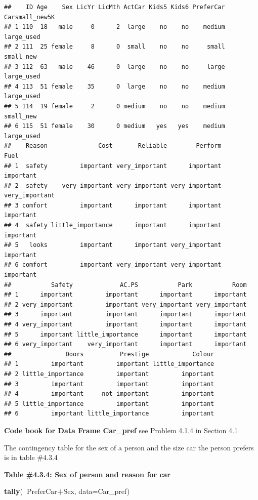 \documentclass[
]{book}
\newenvironment{Shaded}{\begin{snugshade}}{\end{snugshade}}
\newcommand{\DataTypeTok}[1]{\textcolor[rgb]{0.13,0.29,0.53}{#1}}
\newcommand{\KeywordTok}[1]{\textcolor[rgb]{0.13,0.29,0.53}{\textbf{#1}}}
\newcommand{\NormalTok}[1]{#1}
\newcommand{\OperatorTok}[1]{\textcolor[rgb]{0.81,0.36,0.00}{\textbf{#1}}}
\begin{document}
\begin{verbatim}
##    ID Age    Sex LicYr LicMth ActCar Kids5 Kids6 PreferCar Carsmall_new5K
## 1 110  18   male     0      2  large    no    no    medium     large_used
## 2 111  25 female     8      0  small    no    no     small      small_new
## 3 112  63   male    46      0  large    no    no     large     large_used
## 4 113  51 female    35      0  large    no    no    medium     large_used
## 5 114  19 female     2      0 medium    no    no    medium      small_new
## 6 115  51 female    30      0 medium   yes   yes    medium     large_used
##    Reason              Cost       Reliable        Perform           Fuel
## 1  safety         important very_important      important      important
## 2  safety    very_important very_important very_important very_important
## 3 comfort         important      important      important      important
## 4  safety little_importance      important      important      important
## 5   looks         important      important very_important      important
## 6 comfort         important very_important very_important      important
##           Safety             AC.PS           Park           Room
## 1      important         important      important      important
## 2 very_important         important very_important very_important
## 3      important         important      important      important
## 4 very_important         important      important      important
## 5      important little_importance      important      important
## 6 very_important    very_important      important      important
##               Doors          Prestige            Colour
## 1         important         important little_importance
## 2 little_importance         important         important
## 3         important         important         important
## 4         important     not_important         important
## 5 little_importance         important         important
## 6         important little_importance         important
\end{verbatim}

\textbf{Code book for Data Frame Car\_pref} see Problem 4.1.4 in Section 4.1

The contingency table for the sex of a person and the size car the person prefers is in table \#4.3.4

\textbf{Table \#4.3.4: Sex of person and reason for car}

\begin{Shaded}
\begin{Highlighting}[]
\KeywordTok{tally}\NormalTok{(}\OperatorTok{~}\NormalTok{PreferCar}\OperatorTok{+}\NormalTok{Sex, }\DataTypeTok{data=}\NormalTok{Car_pref)}
\end{Highlighting}
\end{Shaded}
\end{document}
